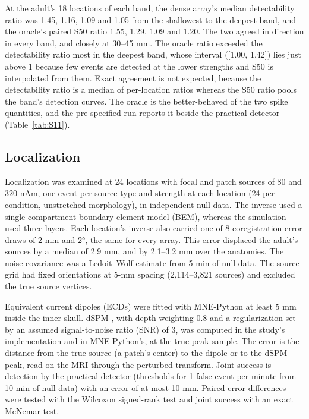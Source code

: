 \documentclass[preprint,12pt,authoryear,a4paper]{elsarticle}
\begin{document}
At the adult's 18 locations of each band, the dense array's median detectability ratio was 1.45, 1.16, 1.09 and 1.05 from the shallowest to the deepest band, and the oracle's paired S50 ratio 1.55, 1.29, 1.09 and 1.20. The two agreed in direction in every band, and closely at 30–45 mm. The oracle ratio exceeded the detectability ratio most in the deepest band, whose interval ([1.00, 1.42]) lies just above 1 because few events are detected at the lower strengths and S50 is interpolated from them. Exact agreement is not expected, because the detectability ratio is a median of per-location ratios whereas the S50 ratio pools the band's detection curves. The oracle is the better-behaved of the two spike quantities, and the pre-specified run reports it beside the practical detector (Table~\ref{tab:S11}).

\subsection{Localization}\label{sec:S7.3}

Localization was examined at 24 locations with focal and patch sources of 80 and 320 nAm, one event per source type and strength at each location (24 per condition, unstretched morphology), in independent null data. The inverse used a single-compartment boundary-element model (BEM), whereas the simulation used three layers. Each location's inverse also carried one of 8 coregistration-error draws of 2 mm and 2°, the same for every array. This error displaced the adult's sources by a median of 2.9 mm, and by 2.1–3.2 mm over the anatomies. The noise covariance was a Ledoit--Wolf estimate from 5 min of null data. The source grid had fixed orientations at 5-mm spacing (2,114–3,821 sources) and excluded the true source vertices.

Equivalent current dipoles (ECDs) were fitted with MNE-Python \citep{gramfort2013} at least 5 mm inside the inner skull. dSPM \citep{dale2000}, with depth weighting 0.8 and a regularization set by an assumed signal-to-noise ratio (SNR) of 3, was computed in the study's implementation and in MNE-Python's, at the true peak sample. The error is the distance from the true source (a patch's center) to the dipole or to the dSPM peak, read on the MRI through the perturbed transform. Joint success is detection by the practical detector (thresholds for 1 false event per minute from 10 min of null data) with an error of at most 10 mm. Paired error differences were tested with the Wilcoxon signed-rank test and joint success with an exact McNemar test.
\end{document}
